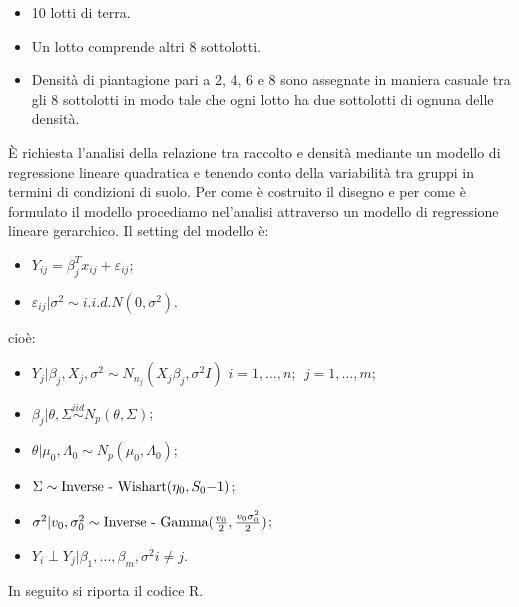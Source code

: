 \begin{itemize}[-]
    \item 10 lotti di terra.
    \item Un lotto comprende altri 8 sottolotti.
    \item Densità di piantagione pari a 2, 4, 6 e 8 sono assegnate in maniera casuale tra
    gli 8 sottolotti in modo tale che ogni lotto ha due sottolotti di ognuna delle densità.
\end{itemize}

È richiesta l'analisi della relazione tra raccolto e densità mediante un modello di regressione
lineare quadratica e tenendo conto della variabilità tra gruppi in termini di condizioni di suolo.
Per come è costruito il disegno e per come è formulato il modello procediamo nel'analisi attraverso
un modello di regressione lineare gerarchico. Il setting del modello è:\\

\begin{itemize}[-]
	\item $ Y_{ij} = {\beta^T_jx_{ij}} + \varepsilon_{ij}$;
	\item $\varepsilon_{ij}|\sigma^2 \sim i.i.d. N(0,\sigma^2)$.
\end{itemize}

cioè:

\begin{itemize}[-]
	\item $Y_j | \beta_j, X_j, \sigma^2 \sim N_{n_j} ({X_j \beta_j}, \sigma^2 {I})$\quad
	$i = 1, \dots, n;\ \  j = 1, \dots, m$; 
	\item $ \beta_j | \theta, \Sigma \stackrel{iid}{\sim} N_{p} (\theta, \Sigma)$;
	\item $\theta| \mu_0,\Lambda_0 \sim N_p(\mu_0,\Lambda_0) $;
	\item $\Sigma \sim \text{\normalfont{Inverse - Wishart}}(\eta_0, S_0{-1})$;
	\item $ \sigma^2 | v_0, \sigma^2_0\sim \text{\normalfont{Inverse - Gamma}}(\frac{v_0}{2}, \frac{v_0\sigma^2_0}{2})$;
	\item $ Y_i \perp Y_j | \beta_1, \dots, \beta_m, \sigma^2 i \neq j$.
\end{itemize}

In seguito si riporta il codice R.

